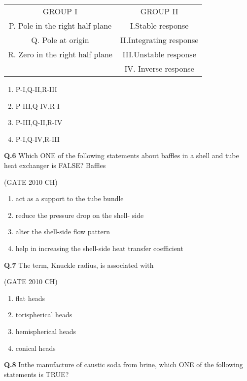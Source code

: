 \documentclass[journal,12pt,onecolumn]{exam}
\theoremstyle{remark}
\begin{document}
 
     \begin{tabular}{c|c}
       GROUP I & GROUP II \\ 
       P. Pole in the right half plane & I.Stable response\\
   Q. Pole at origin & II.Integrating response\\
   R. Zero in the right half plane & III.Unstable response\\ 
                & IV. Inverse response
     \end{tabular}
  
\begin{enumerate}
    \item P-I,Q-II,R-III
    \item P-III,Q-IV,R-I
    \item P-III,Q-II,R-IV
    \item P-I,Q-IV,R-III
    
\end{enumerate}
         
    \noindent
    \textbf{Q.6}
    Which ONE of the following statements about baffles in a shell and tube heat exchanger is FALSE? Baffles
   
\hfill{(GATE 2010 CH)}\\
   
    \begin{enumerate}
        \item act as a support to the tube bundle
        \item reduce the pressure drop on the shell- side
        \item alter the shell-side flow pattern
        \item help in increasing the shell-side heat transfer coefficient
    \end{enumerate}

    \noindent 
    \textbf{Q.7}
    The term, Knuckle radius, is associated with
   
   \hfill{(GATE 2010 CH)}\\
   
   \begin{enumerate}
       \item flat heads
       \item torispherical heads
       \item hemispherical heads
       \item conical heads
   \end{enumerate}

   \noindent
   \textbf{Q.8}
   Inthe manufacture of caustic soda from brine, which ONE of the following statements is TRUE?
   
\end{document}
